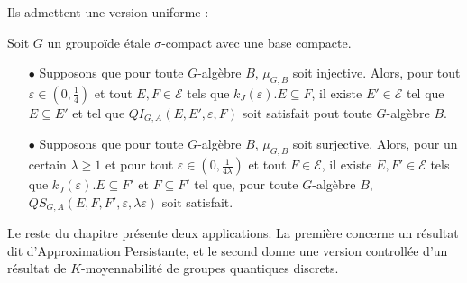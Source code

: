 Ils admettent une version uniforme :
\begin{thmfr} Soit $G$ un groupoïde étale $\sigma$-compact avec une base compacte. \\
\begin{itemize}
\item[$\bullet$] Supposons que pour toute $G$-algèbre $B$, $\mu_{G,B}$ soit injective. Alors, pour tout $\varepsilon\in (0,\frac{1}{4})$ et tout $E,F\in\mathcal E$ tels que $k_J(\varepsilon). E\subseteq F$, il existe $E'\in\mathcal E$ tel que $E\subseteq E'$ et tel que $QI_{G,A}(E,E',\varepsilon,F)$ soit satisfait pout toute $G$-algèbre $B$.\\
\item[$\bullet$] Supposons que pour toute $G$-algèbre $B$, $\mu_{G,B}$ soit surjective. Alors, pour un certain $\lambda \geq 1$ et pour tout $\varepsilon\in (0,\frac{1}{4\lambda})$ et tout $F\in\mathcal E$, il existe $E,F'\in\mathcal E$ tels que $k_J(\varepsilon). E\subseteq F'$ et $F\subseteq F'$ tel que, pour toute $G$-algèbre $B$, $QS_{G,A}(E, F,F',\varepsilon,\lambda \varepsilon)$ soit satisfait.
\end{itemize}
\end{thmfr}

Le reste du chapitre présente deux applications. La première concerne un résultat dit d'Approximation Persistante, et le second donne une version controllée d'un résultat de $K$-moyennabilité de groupes quantiques discrets. \\

